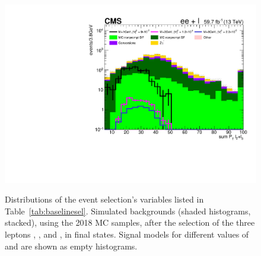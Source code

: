 \begin{figure}[h]
{  \includegraphics[clip,trim=0.9cm 0 0.7cm 0,width=.25\textwidth]{Figures/c6/selection/18/e_sum_Pt_L2L3__0.pdf}}\\
  \caption{Distributions of the event selection's variables listed in
    Table~\ref{tab:baselinesel}. Simulated backgrounds (shaded histograms, stacked),
    using the 2018 MC samples, 
    after the selection of the three leptons \lone, \ltwo, and \lthree,
    in \eex final states.
    Signal models for different values of \mhnl and \mixpar are shown
    as empty histograms.}
  \label{fig:selection_electrons}
\end{figure}



